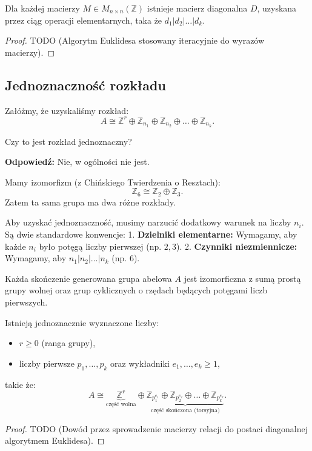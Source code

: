 \begin{theorem}
    Dla każdej macierzy $M \in M_{n\times n}(\mathbb{Z})$ istnieje macierz diagonalna $D$, uzyskana przez ciąg operacji elementarnych, taka że $d_1 | d_2 | \ldots | d_k$.
\end{theorem}
\begin{proof}
    TODO (Algorytm Euklidesa stosowany iteracyjnie do wyrazów macierzy).
\end{proof}

\subsection{Jednoznaczność rozkładu}

Załóżmy, że uzyskaliśmy rozkład:
\[ A \cong \mathbb{Z}^r \oplus \mathbb{Z}_{n_1} \oplus \mathbb{Z}_{n_2} \oplus \ldots \oplus \mathbb{Z}_{n_k}. \]

\begin{question}
    Czy to jest rozkład jednoznaczny?
\end{question}

\textbf{Odpowiedź:} Nie, w ogólności nie jest.
\begin{eg}
    Mamy izomorfizm (z Chińskiego Twierdzenia o Resztach):
    \[ \mathbb{Z}_{6} \cong \mathbb{Z}_{2} \oplus \mathbb{Z}_{3}. \]
    Zatem ta sama grupa ma dwa różne rozkłady.
\end{eg}

Aby uzyskać jednoznaczność, musimy narzucić dodatkowy warunek na liczby $n_i$. Są dwie standardowe konwencje:
1.  \textbf{Dzielniki elementarne:} Wymagamy, aby każde $n_i$ było potęgą liczby pierwszej (np. $2, 3$).
2.  \textbf{Czynniki niezmiennicze:} Wymagamy, aby $n_1 | n_2 | \ldots | n_k$ (np. $6$).


\begin{theorem}
    Każda skończenie generowana grupa abelowa $A$ jest izomorficzna z sumą prostą grupy wolnej oraz grup cyklicznych o rzędach będących potęgami liczb pierwszych.
    
    Istnieją jednoznacznie wyznaczone liczby:
    \begin{itemize}
        \item $r \ge 0$ (ranga grupy),
        \item liczby pierwsze $p_1, \ldots, p_k$ oraz wykładniki $e_1, \ldots, e_k \ge 1$,
    \end{itemize}
    takie że:
    \[
        A \cong \underbrace{\mathbb{Z}^r}_{\text{część wolna}} \oplus \underbrace{\mathbb{Z}_{p_1^{e_1}} \oplus \mathbb{Z}_{p_2^{e_2}} \oplus \ldots \oplus \mathbb{Z}_{p_k^{e_k}}}_{\text{część skończona (torsyjna)}}.
    \]
\end{theorem}
\begin{proof}
    TODO (Dowód przez sprowadzenie macierzy relacji do postaci diagonalnej algorytmem Euklidesa).
\end{proof}

